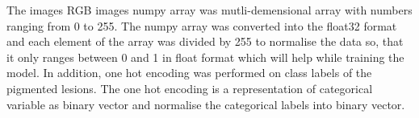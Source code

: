 The images RGB images numpy array was mutli-demensional array with numbers ranging from 0 to 255.
The numpy array was converted into the float32 format and each element of the array was divided by 255 to normalise the data so, that 
it only ranges between 0 and 1 in float format which will help while training the model. In addition, one hot encoding 
was performed on class labels of the pigmented lesions. The one hot encoding is a representation of categorical variable 
as binary vector and normalise the categorical labels into binary vector.